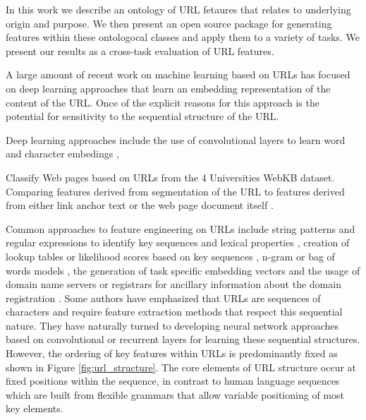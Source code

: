 \documentclass[sigconf]{acmart}
\begin{document}
In this work we describe an ontology of URL fetaures that relates to underlying origin
and purpose. We then present an open source package for generating features within these
ontologocal classes and apply them to a variety of tasks. We present our results as a
cross-task evaluation of URL features.  
 
A large amount of recent work on machine learning based on URLs has focused on deep learning approaches that
learn an embedding representation of the content of the URL. Once of the explicit reasons 
for this approach is the potential for sensitivity to the sequential structure of the URL.
\cite{Le2018}

Deep learning approaches include the use of convolutional layers to learn word and character 
embedings \cite{Le2018},

\cite{Ayes2019}
\cite{Li2020}
\cite{Basnet2012}
\cite{Basnet2014}
\cite{Tupsamudre2019}
\cite{Baykan2009}
\cite{Kan2005}
\cite{Hernandez2012}
\cite{Chung2010}
\cite{Qiu2020}
\cite{Xu2021}
\cite{Rhea2022}
\cite{Ma2009}
\cite{Verma2017}
\cite{Sountharrajan2020}
\cite{Murthy2022}

Classify Web pages based on URLs from the 4 Universities WebKB dataset. Comparing features derived from segmentation
of the URL to features derived from either link anchor text or the web page document itself \cite{Kan2004}.

Common approaches to feature engineering on URLs include string patterns and regular expressions to
identify key sequences and lexical properties \cite{Kan2004,Mamun2016}, 
creation of lookup tables or likelihood scores based on key sequences
\cite{Meshkizadeh2010}, n-gram or bag of words models \cite{Baykan2009}, 
the generation of task specific embedding vectors\cite{Le2018,Qiu2020} and the
usage of domain name servers or registrars for ancillary information about the domain registration \cite{Canali2011}. 
Some authors have 
emphasized that URLs are sequences of characters and require feature extraction methods that respect 
this sequential nature\cite{Le2018,Vazhayil2018}. They have naturally turned to developing neural network approaches
based on convolutional or recurrent layers for learning these sequential structures.
However, the ordering of key features within URLs is predominantly fixed as shown in Figure \ref{fig:url_structure}.
The core elements of URL structure occur at fixed positions within the sequence, in contrast to human language
sequences which are built from flexible grammars that allow variable positioning of most key elements.
\end{document}
